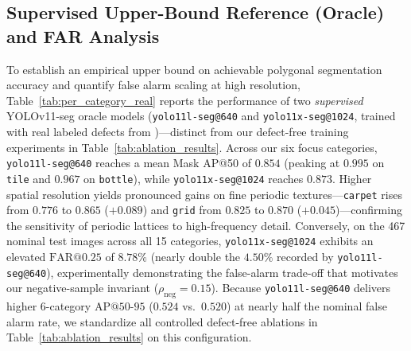 \subsection{Supervised Upper-Bound Reference (Oracle) and FAR Analysis}
To establish an empirical upper bound on achievable polygonal segmentation accuracy and quantify false alarm scaling at high resolution, Table~\ref{tab:per_category_real} reports the performance of two \textit{supervised} YOLOv11-seg oracle models (\texttt{yolo11l-seg@640} and \texttt{yolo11x-seg@1024}, trained with real labeled defects from \cite{kudupudi2025industrial})---distinct from our defect-free training experiments in Table~\ref{tab:ablation_results}. Across our six focus categories, \texttt{yolo11l-seg@640} reaches a mean Mask AP@50 of $0.854$ (peaking at $0.995$ on \texttt{tile} and $0.967$ on \texttt{bottle}), while \texttt{yolo11x-seg@1024} reaches $0.873$. Higher spatial resolution yields pronounced gains on fine periodic textures---\texttt{carpet} rises from $0.776$ to $0.865$ ($+0.089$) and \texttt{grid} from $0.825$ to $0.870$ ($+0.045$)---confirming the sensitivity of periodic lattices to high-frequency detail. Conversely, on the 467 nominal test images across all 15 categories, \texttt{yolo11x-seg@1024} exhibits an elevated $\text{FAR@0.25}$ of $8.78\%$ (nearly double the $4.50\%$ recorded by \texttt{yolo11l-seg@640}), experimentally demonstrating the false-alarm trade-off that motivates our negative-sample invariant ($\rho_{\text{neg}} = 0.15$). Because \texttt{yolo11l-seg@640} delivers higher 6-category $\text{AP@50-95}$ ($0.524$ vs.\ $0.520$) at nearly half the nominal false alarm rate, we standardize all controlled defect-free ablations in Table~\ref{tab:ablation_results} on this configuration.

